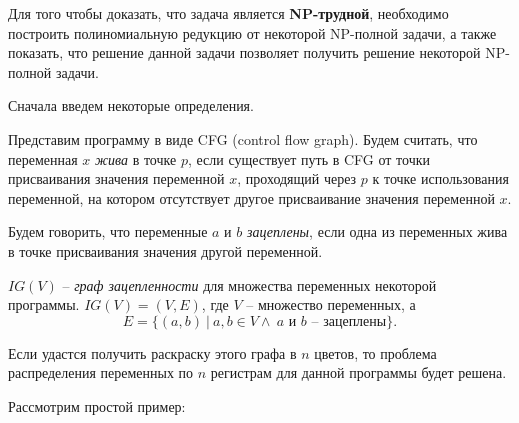 Для того чтобы доказать, что задача является \textbf{NP-трудной}, необходимо построить полиномиальную редукцию
от некоторой NP-полной задачи, а также показать, что решение данной задачи позволяет получить решение некоторой
NP-полной задачи.

Сначала введем некоторые определения.

\begin{definition}

    \label{def:liveness} %

Представим программу в виде CFG (control flow graph).
    Будем считать, что переменная $x$ \textit{жива} в точке $p$, если существует путь в CFG от точки присваивания значения переменной $x$, проходящий
    через $p$ к точке использования переменной, на котором отсутствует другое присваивание значения переменной $x$.

\end{definition}

\begin{definition}

    Будем говорить, что переменные $a$ и $b$ \textit{зацеплены}, если одна из переменных жива в точке присваивания значения
    другой переменной.

\end{definition}

\begin{definition}

    $IG(V)$ -- \textit{граф зацепленности} для множества переменных некоторой программы.
    $IG(V) = (V, E)$, где $V$ -- множество переменных, а
    $$E = \{(a, b) \ | \  a, b \in V \land \ a \text{ и } b \text{ -- зацеплены}\}.$$

\end{definition}

Если удастся получить раскраску этого графа в $n$ цветов, то проблема распределения переменных по
$n$ регистрам для данной программы будет решена.

Рассмотрим простой пример:

